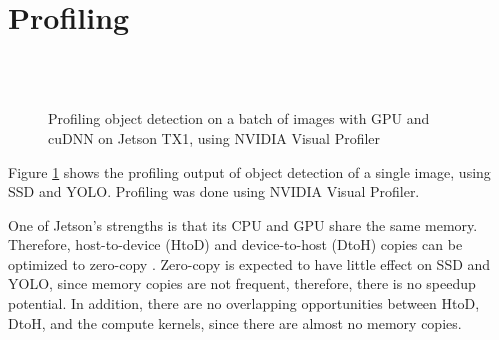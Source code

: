 \section{Profiling}
\label{sec:profiling}

\begin{figure}[t]
  \begin{center}
     \\
     \\
    \caption{Profiling object detection on a batch of images with GPU and cuDNN on Jetson TX1, using NVIDIA Visual Profiler}
    \label{fig:profile}
  \end{center}
\end{figure}

Figure \ref{fig:profile} shows the profiling output of object detection of a single image, using SSD and YOLO. Profiling was done using NVIDIA Visual Profiler.

One of Jetson's strengths is that its CPU and GPU share the same memory. Therefore, host-to-device (HtoD) and device-to-host (DtoH) copies can be optimized to zero-copy \cite{tegrazerocopy}. Zero-copy is expected to have little effect on SSD and YOLO, since memory copies are not frequent, therefore, there is no speedup potential. In addition, there are no overlapping opportunities between HtoD, DtoH, and the compute kernels, since there are almost no memory copies.

